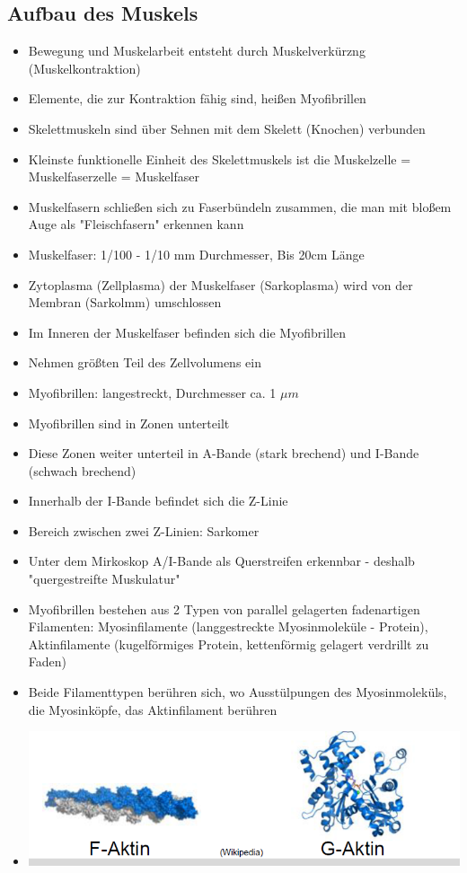 \documentclass[a4paper,10pt,oneside]{article}
\begin{document}
\subsection{Aufbau des Muskels}
	\begin{itemize}
		\item Bewegung und Muskelarbeit entsteht durch Muskelverkürzng (Muskelkontraktion)
		\item Elemente, die zur Kontraktion fähig sind, heißen Myofibrillen
		\item Skelettmuskeln sind über Sehnen mit dem Skelett (Knochen) verbunden
		\item Kleinste funktionelle Einheit des Skelettmuskels ist die Muskelzelle = Muskelfaserzelle = Muskelfaser 
		\item Muskelfasern schließen sich zu Faserbündeln zusammen, die man mit bloßem Auge als "Fleischfasern" erkennen kann
		\item Muskelfaser: 1/100 - 1/10 mm Durchmesser, Bis 20cm Länge
		\item Zytoplasma (Zellplasma) der Muskelfaser (Sarkoplasma) wird von der Membran (Sarkolmm) umschlossen
		\item Im Inneren der Muskelfaser befinden sich die Myofibrillen
		\item Nehmen größten Teil des Zellvolumens ein
		\item Myofibrillen: langestreckt, Durchmesser ca. 1 $\mu m$
		\item Myofibrillen sind in Zonen unterteilt
		\item Diese Zonen weiter unterteil in A-Bande (stark brechend) und I-Bande (schwach brechend)
		\item Innerhalb der I-Bande befindet sich die Z-Linie
		\item Bereich zwischen zwei Z-Linien: Sarkomer
		\item Unter dem Mirkoskop A/I-Bande als Querstreifen erkennbar - deshalb "quergestreifte Muskulatur"
		\item Myofibrillen bestehen aus 2 Typen von parallel gelagerten fadenartigen Filamenten: Myosinfilamente (langgestreckte Myosinmoleküle - Protein), Aktinfilamente (kugelförmiges Protein, kettenförmig gelagert verdrillt zu Faden)
		\item Beide Filamenttypen berühren sich, wo Ausstülpungen des Myosinmoleküls, die Myosinköpfe, das Aktinfilament berühren
		\item[] \includegraphics[scale=0.1]{Grafiken/1414.png}
		
	\end{itemize}
\end{document}
